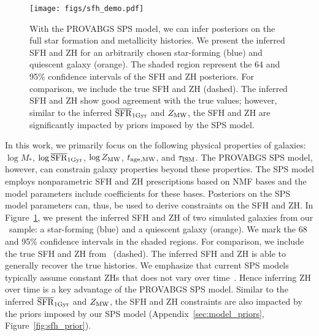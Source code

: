 \begin{figure}
\begin{center}
\texttt{[image: figs/sfh\_demo.pdf]}
    \caption{
        With the {\sc PROVABGS} SPS model, we can infer posteriors on the full
        star formation and metallicity histories. 
        We present the inferred SFH and ZH for an arbitrarily chosen
        star-forming (blue) and quiescent galaxy (orange).
        The shaded region represent the 64 and 95\% confidence intervals of the
        SFH and ZH posteriors. 
        For comparison, we include the true SFH and ZH (dashed). 
        The inferred SFH and ZH show good agreement with the true values;
        however, similar to the inferred $\overline{\rm SFR}_{\rm 1Gyr}$ and $Z_{\rm MW}$, the SFH and ZH
        are significantly impacted by priors imposed by the SPS model. 
    } \label{fig:sfh_demo}
\end{center}
\end{figure}

In this work, we primarily focus on the following physical properties of
galaxies: $\log M_*$, $\log\overline{\rm SFR}_{\rm 1Gyr}$, $\log Z_{\rm MW}$, $t_{\rm age, MW}$, and $\tau_{\rm ISM}$. 
The {\sc PROVABGS} SPS model, however, can constrain galaxy properties beyond
these properties. 
The SPS model employs nonparametric SFH and ZH prescriptions based on NMF bases
and the model parameters include coefficients for these bases. 
Posteriors on the SPS model parameters can, thus, be used to derive constraints
on the SFH and ZH. 
In Figure~\ref{fig:sfh_demo}, we present the inferred SFH and ZH of two
simulated galaxies from our \lgal~sample: a star-forming (blue) and a quiescent
galaxy (orange). 
We mark the 68 and 95\% confidence intervals in the shaded regions. 
For comparison, we include the true SFH and ZH from \lgal~(dashed).  
The inferred SFH and ZH is able to generally recover the true histories. 
We emphasize that current SPS models typically assume constant ZHs that does
not vary over time~\citep{carnall2017, leja2019}. 
Hence inferring ZH over time is a key advantage of the {\sc PROVABGS} SPS
model. 
Similar to the inferred $\overline{\rm SFR}_{\rm 1Gyr}$ and $Z_{\rm MW}$, the SFH and ZH constraints are
also impacted by the priors imposed by our SPS model
(Appendix~\ref{sec:model_priors}, Figure~\ref{fig:sfh_prior}).

